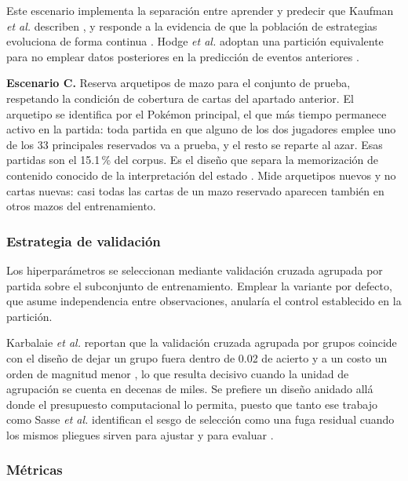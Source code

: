 Este escenario implementa la separación entre aprender y predecir que Kaufman
\textit{et al.} describen \cite{kaufman_leakage_2011}, y responde a la
evidencia de que la población de estrategias evoluciona de forma continua
\cite{saravanan_metadiscovery_2024}. Hodge \textit{et al.} adoptan una
partición equivalente para no emplear datos posteriores en la predicción de
eventos anteriores \cite{hodge_winprediction_2021}.

\noindent\textbf{Escenario C.} Reserva arquetipos de mazo para el conjunto
de prueba, respetando la condición de cobertura de cartas del apartado
anterior. El arquetipo se identifica por el Pok\'emon principal, el que más
tiempo permanece activo en la partida: toda partida en que alguno de los dos
jugadores emplee uno de los 33 principales reservados va a prueba, y el
resto se reparte al azar. Esas partidas son el 15.1\,\% del corpus. Es el
diseño que separa la memorización de contenido conocido de la
interpretación del estado
\cite{bertram_cardrepresentations_2024,angliss_vgcbench_2026}. Mide
arquetipos nuevos y no cartas nuevas: casi todas las cartas de un mazo
reservado aparecen también en otros mazos del entrenamiento.

\subsubsection{Estrategia de validación}

Los hiperparámetros se seleccionan mediante validación cruzada agrupada por
partida sobre el subconjunto de entrenamiento. Emplear la variante por
defecto, que asume independencia entre observaciones, anularía el control
establecido en la partición.

Karbalaie \textit{et al.} reportan que la validación cruzada agrupada por
grupos coincide con el diseño de dejar un grupo fuera dentro de 0.02 de
acierto y a un costo un orden de magnitud menor
\cite{karbalaie_participantaware_2026}, lo que resulta decisivo cuando la
unidad de agrupación se cuenta en decenas de miles. Se prefiere un diseño
anidado allá donde el presupuesto computacional lo permita, puesto que tanto
ese trabajo como Sasse \textit{et al.} identifican el sesgo de selección como
una fuga residual cuando los mismos pliegues sirven para ajustar y para
evaluar \cite{sasse_leakage_2025}.

\subsubsection{Métricas}

